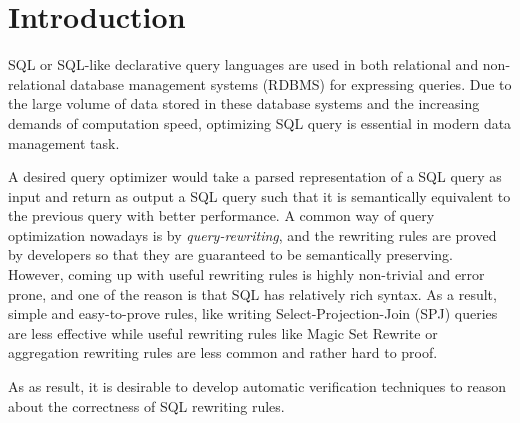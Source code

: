 \section{Introduction}

SQL or SQL-like declarative query languages are used in both relational and non-relational database management systems (RDBMS) for expressing queries. Due to the large volume of data stored in these database systems and the increasing demands of computation speed, optimizing SQL query is essential in modern data management task. 

A desired query optimizer would take a parsed representation of a SQL query as input and return as output a SQL query such that it is semantically equivalent to the previous query with better performance. A common way of query optimization nowadays is by \emph{query-rewriting}, and the rewriting rules are proved by developers so that they are guaranteed to be semantically preserving. However, coming up with useful rewriting rules is highly non-trivial and error prone, and one of the reason is that SQL has relatively rich syntax. As a result, simple and easy-to-prove rules, like writing Select-Projection-Join (SPJ) queries are less effective while useful rewriting rules like Magic Set Rewrite or aggregation rewriting rules are less common and rather hard to proof.

As as result, it is desirable to develop automatic verification techniques to reason about the correctness of SQL rewriting rules. 